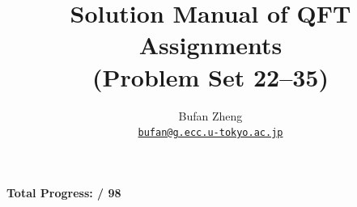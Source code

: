 \documentclass[11pt]{article}
\title{\Huge Solution Manual of QFT Assignments\\(Problem Set 22--35)}
\author{Bufan Zheng\\ \href{mailto:bufan@g.ecc.u-tokyo.ac.jp}{\texttt{bufan@g.ecc.u-tokyo.ac.jp}} }
\newcounter{numSolved}
\newcommand{\totalQuestions}{98}
\newcounter{problem}
\begin{document}
	
	\maketitle
	
	\begin{center}
		\Large\textbf{Total Progress:  / \totalQuestions}
	\end{center}
	
	\listofmyproblem
	
	\clearpage
	
	\clearpage
	
	\clearpage
	
	\clearpage
	
	\clearpage
	
	\clearpage
	
	\clearpage
	
	\clearpage
	
	\clearpage
		
	\clearpage
	
	\clearpage
	
	\clearpage
	
	\clearpage
	
	\clearpage
	
\end{document}
